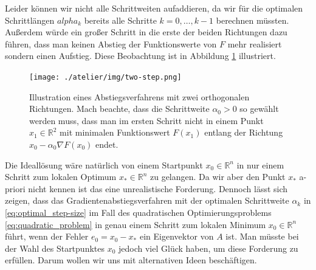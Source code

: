 Leider können wir nicht alle Schrittweiten aufaddieren, da wir für die optimalen Schrittlängen $alpha_k$ bereits alle Schritte $k=0,\ldots,k-1$ berechnen müssten.
Außerdem würde ein großer Schritt in die erste der beiden Richtungen dazu führen, dass man keinen Abstieg der Funktionswerte von $F$ mehr realisiert sondern einen Aufstieg.
Diese Beobachtung ist in Abbildung \ref{fig:two-step} illustriert.
\begin{figure}[tbh]
\centering
\texttt{[image: ./atelier/img/two-step.png]}
\caption{Illustration eines Abstiegsverfahrens mit zwei orthogonalen Richtungen. Mach beachte, dass die Schrittweite $\alpha_0 > 0$ so gewählt werden muss, dass man im ersten Schritt nicht in einem Punkt $x_1 \in \mathbb{R}^2$ mit minimalen Funktionswert $F(x_1)$ entlang der Richtung $x_0 - \alpha_0 \nabla F(x_0)$ endet.}
\label{fig:two-step}
\end{figure}

Die Ideallösung wäre natürlich von einem Startpunkt $x_0 \in \mathbb{R}^n$ in nur einem Schritt zum lokalen Optimum $x_* \in \mathbb{R}^n$ zu gelangen.
Da wir aber den Punkt $x_*$ a-priori nicht kennen ist das eine unrealistische Forderung.
Dennoch lässt sich zeigen, dass das Gradientenabstiegsverfahren mit der optimalen Schrittweite $\alpha_k$ in \eqref{eq:optimal_step-size} im Fall des quadratischen Optimierungsproblems \eqref{eq:quadratic_problem} in genau einem Schritt zum lokalen Minimum $x_0 \in \mathbb{R}^n$ führt, wenn der Fehler $e_0 = x_0 - x_*$ ein Eigenvektor von $A$ ist.
Man müsste bei der Wahl des Startpunktes $x_0$ jedoch viel Glück haben, um diese Forderung zu erfüllen.
Darum wollen wir uns mit alternativen Ideen beschäftigen.

